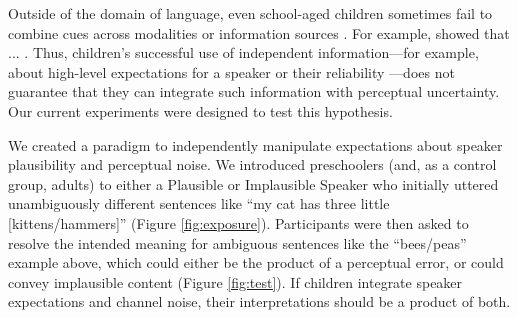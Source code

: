 \documentclass[man,floatsintext]{apa6}
\begin{document}
Outside of the domain of language, even school-aged children sometimes fail to combine cues across modalities or information sources \cite{}. For example,  showed that ... . Thus, children's successful use of independent information---for example, about high-level expectations for a speaker  or their reliability \cite{pasquini2008}---does not guarantee that they can integrate such information with perceptual uncertainty. Our current experiments were designed to test this hypothesis.


We created a paradigm to independently manipulate expectations about speaker plausibility and perceptual noise. We introduced preschoolers (and, as a control group, adults) to either a Plausible or Implausible Speaker who initially uttered unambiguously different sentences like ``my cat has three little [kittens/hammers]'' (Figure \ref{fig:exposure}). Participants were then asked to resolve the intended meaning for ambiguous sentences like the ``bees/peas'' example above, which could either be the product of a perceptual error, or could convey implausible content (Figure \ref{fig:test}). If children integrate speaker expectations and channel noise, their interpretations should be a product of both.

\end{document}
